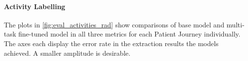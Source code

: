 \paragraph{Activity Labelling} The plots in \autoref{fig:eval_activities_rad} show comparisons of base model and multi-task fine-tuned model in all three metrics for each Patient Journey individually. The axes each display the error rate in the extraction results the models achieved. A smaller amplitude is desirable.\\
\begin{figure}
  \centering

\end{figure}

